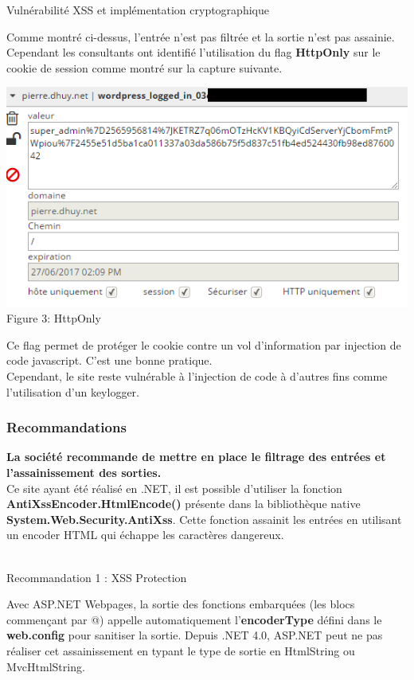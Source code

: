 \documentclass[twoside,a4paper,12pt,titlepage]{book}
\begin{document}
\begin{LongFlagConsole}{Vulnérabilité XSS et implémentation cryptographique}
{{Comme montré ci-dessus, l'entrée n'est pas filtrée et la sortie n'est pas assainie. Cependant les consultants ont identifié l'utilisation du flag \textbf{HttpOnly} sur le cookie de session comme montré sur la capture suivante.
\begin{center}\includegraphics[width=.7\textwidth]{audit_proof_3.png}\\Figure 3: HttpOnly\end{center}
Ce flag permet de protéger le cookie contre un vol d'information par injection de code javascript. C'est une bonne pratique.\\
Cependant, le site reste vulnérable à l'injection de code à d'autres fins comme l'utilisation d'un keylogger.
\subsubsection*{Recommandations}
\textbf{La société recommande de mettre en place le filtrage des entrées et l'assainissement des sorties.}\\
Ce site ayant été réalisé en .NET, il est possible d'utiliser la fonction \textbf{AntiXssEncoder.HtmlEncode()} présente dans la bibliothèque native \textbf{System.Web.Security.AntiXss}. Cette fonction assainit les entrées en utilisant un encoder HTML qui échappe les caractères dangereux.
\begin{center}\usebox\SchematicsBox \\
Recommandation 1 : XSS Protection \end{center}
Avec ASP.NET Webpages, la sortie des fonctions embarquées (les blocs commençant par @) appelle automatiquement l'\textbf{encoderType} défini dans le \textbf{web.config} pour sanitiser la sortie. Depuis .NET 4.0, ASP.NET peut ne pas réaliser cet assainissement en typant le type de sortie en HtmlString ou MvcHtmlString.\\
}}
\normalsize
\tcblower
\begin{lrbox}{\SchematicsBox}
\end{lrbox}
\small
\noindent
{}
\end{LongFlagConsole}
\end{document}
